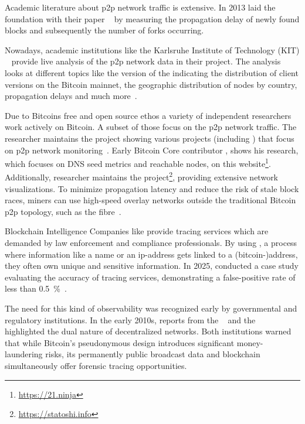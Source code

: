 Academic literature about \gls{p2p} network traffic is extensive. 
In 2013 \citeauthor{decker_information_2013}  %
laid the foundation with their paper  ~\cite{decker_information_2013}
by measuring the propagation delay of newly found blocks and subsequently the number of forks occurring.

Nowadays, academic institutions like the Karlsruhe Institute of Technology (KIT) ~\cite{neudecker_2026_14627526} 
provide live analysis of the \gls{p2p} network data in their  project.
The analysis looks at different topics like the version of the  
indicating the distribution of client versions on the Bitcoin mainnet, 
the geographic distribution of nodes by country, propagation delays and much more~\cite{kit_bitcoin_monitoring_web}. 


Due to Bitcoins free and open source ethos a variety of independent researchers work actively on Bitcoin. 
A subset of those focus on the \gls{p2p} network traffic.
The researcher \citeauthor{0xb10c_map_2026} maintains the project  showing 
various projects (including ) that focus on \gls{p2p} network monitoring~\cite{0xb10c_map_2026}.
Early Bitcoin Core contributor \citeauthor{corallo_21ninja}, shows his research, 
which focuses on DNS seed metrics and reachable nodes, on this website\footnote{\url{https://21.ninja}}.
Additionally, researcher \citeauthor{lopp_satoshi_info} maintains the  project\footnote{\url{https://statoshi.info}}, 
providing extensive network visualizations.
To minimize propagation latency and reduce the risk of stale block races, miners can use 
high-speed overlay networks outside the traditional Bitcoin \gls{p2p} topology, 
such as the \gls{fibre}~\cite{corallo_fibre}.


Blockchain Intelligence Companies like  provide tracing services 
which are demanded by law enforcement and compliance professionals. 
By using , a process where information like a name or an ip-address gets 
linked to a (bitcoin-)address, they often own unique and sensitive information.
In 2025, \citeauthor{lubbertsen_ghost_2025} conducted a case study 
evaluating the accuracy of  tracing services, 
demonstrating a false-positive rate of less than \qty{0.5}{\percent}~\cite{lubbertsen_ghost_2025}.

The need for this kind of observability was recognized early by governmental and regulatory institutions. 
In the early 2010s, reports from the \citeauthor{federalbureauofinvestigation_wayback_2014}~\cite{federalbureauofinvestigation_wayback_2014} 
and the \citeauthor{europeancentralbank_virtual_2012}~\cite{europeancentralbank_virtual_2012} 
highlighted the dual nature of decentralized networks. 
Both institutions warned that while Bitcoin's pseudonymous design introduces significant money-laundering risks, 
its permanently public broadcast data and blockchain simultaneously offer forensic tracing opportunities.



